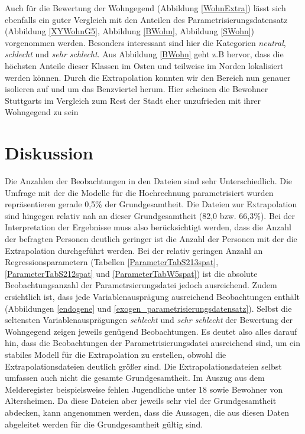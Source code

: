 \documentclass{Vorlage}
\begin{document}
Auch für die Bewertung der Wohngegend (Abbildung \ref{WohnExtra}) lässt sich ebenfalls ein guter Vergleich mit den Anteilen des Parametrisierungsdatensatz (Abbildung \ref{XYWohnG5}, Abbildung \ref{BWohn}, Abbildung \ref{SWohn}) vorgenommen werden. Besonders interessant sind hier die Kategorien \textit{neutral}, \textit{schlecht} und \textit{sehr schlecht}. Aus Abbildung \ref{BWohn} geht z.B hervor, dass die höchsten Anteile dieser Klassen im Osten und teilweise im Norden lokalisiert werden können. Durch die Extrapolation konnten wir den Bereich nun genauer isolieren auf und um das Benzviertel herum. Hier scheinen die Bewohner Stuttgarts im Vergleich zum Rest der Stadt eher unzufrieden mit ihrer Wohngegend zu sein


\clearpage
\section{Diskussion}
Die Anzahlen der Beobachtungen in den Dateien sind sehr Unterschiedlich. Die Umfrage mit der die Modelle für die Hochrechnung parametrisiert wurden repräsentieren gerade 0,5\% der Grundgesamtheit. Die Dateien zur Extrapolation sind hingegen relativ nah an dieser Grundgesamtheit (82,0 bzw. 66,3\%). Bei der Interpretation der Ergebnisse muss also berücksichtigt werden, dass die Anzahl der befragten Personen deutlich geringer ist die Anzahl der Personen mit der die Extrapolation durchgeführt werden. Bei der relativ geringen Anzahl an Regressionsparametern (Tabellen \ref{ParameterTabS213spat}, \ref{ParameterTabS212spat} und \ref{ParameterTabW5spat}) ist die absolute Beobachtungsanzahl der Parametrsierungsdatei jedoch ausreichend. Zudem ersichtlich ist, dass jede Variablenausprägung ausreichend Beobachtungen enthält (Abbildungen \ref{endogene} und \ref{exogen_parametrisierungsdatensatz}). Selbst die seltensten Variablenausprägungen \textit{schlecht} und \textit{sehr schlecht} der Bewertung der Wohngegend zeigen jeweils genügend Beobachtungen. Es deutet also alles darauf hin, dass die Beobachtungen der Parametrisierungsdatei ausreichend sind, um ein stabiles Modell für die Extrapolation zu erstellen, obwohl die Extrapolationsdateien deutlich größer sind. Die Extrapolationsdateien selbst umfassen auch nicht die gesamte Grundgesamtheit. Im Auszug aus dem Melderegister beispielsweise fehlen Jugendliche unter 18 sowie Bewohner von Altersheimen. Da diese Dateien aber jeweils sehr viel der Grundgesamtheit abdecken, kann angenommen werden, dass die Aussagen, die aus diesen Daten abgeleitet werden für die Grundgesamtheit gültig sind.
\end{document}
